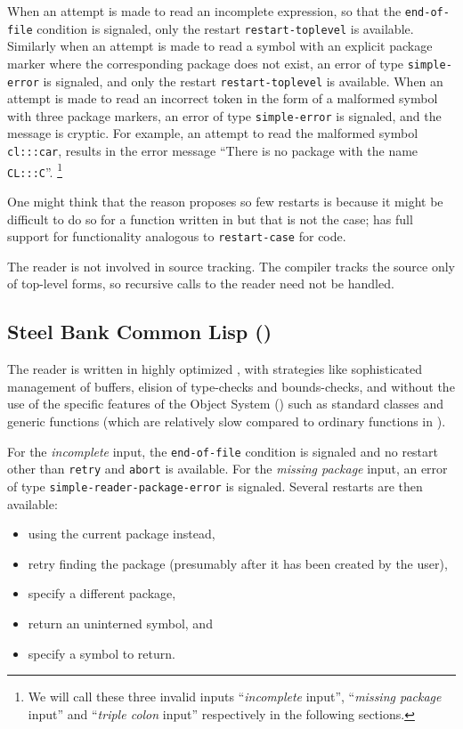 When an attempt is made to read an incomplete expression, so that the
\texttt{end-of-file} condition is signaled, only the restart
\texttt{restart-toplevel} is available.  Similarly when an attempt is
made to read a symbol with an explicit package marker where the
corresponding package does not exist, an error of type
\texttt{simple-error} is signaled, and only the restart
\texttt{restart-toplevel} is available.  When an attempt is made to
read an incorrect token in the form of a malformed symbol with three
package markers, an error of type \texttt{simple-error} is signaled,
and the message is cryptic.  For example, an attempt to read the
malformed symbol \texttt{cl:::car}, results in the error message
``There is no package with the name \texttt{CL:::C}''.%
\footnote{We will call these three invalid inputs ``\emph{incomplete}
  input'', ``\emph{missing package} input'' and ``\emph{triple colon}
  input'' respectively in the following sections.}

One might think that the reason \ecl{} proposes so few restarts is
because it might be difficult to do so for a function written in
\clanguage{} but that is not the case; \ecl{} has full support for
functionality analogous to \texttt{restart-case} for \clanguage{}
code.

The \ecl{} reader is not involved in source tracking.  The compiler
tracks the source only of top-level forms, so recursive calls to the
reader need not be handled.

\subsection{Steel Bank Common Lisp (\sbcl{})}

The \sbcl{} reader is written in highly optimized \cl{}, with
strategies like sophisticated management of buffers, elision of
type-checks and bounds-checks, and without the use of the specific
features of the \cl{} Object System (\clos{}) such as standard classes
and generic functions (which are relatively slow compared to ordinary
functions in \sbcl{}).

For the \emph{incomplete} input, the \texttt{end-of-file} condition is
signaled and no restart other than \texttt{retry} and \texttt{abort}
is available.  For the \emph{missing package} input, an error of type
\texttt{simple-reader-package-error} is signaled.  Several restarts
are then available:

\begin{itemize}
\item using the current package instead,
\item retry finding the package (presumably after it has been created
  by the user),
\item specify a different package,
\item return an uninterned symbol, and
\item specify a symbol to return.
\end{itemize}

